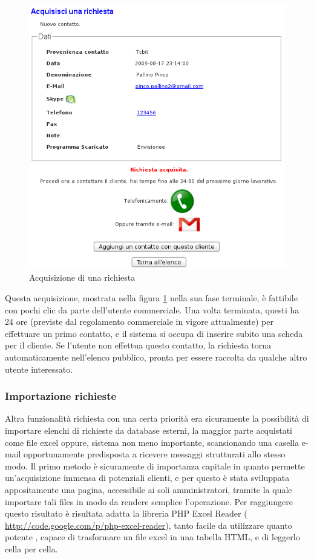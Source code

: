 \begin{figure}[!ht]
\centering
  \includegraphics[scale=0.6]{./images/acquisisciScreen.png}
\caption{Acquisizione di una richiesta}
\label{acq_richieste}
\end{figure}

\noindent
\newpage
Questa acquisizione, mostrata nella figura \ref{acq_richieste} nella sua fase terminale, \`e fattibile con pochi clic da parte dell'utente commerciale. Una volta terminata, questi ha 24 ore (previste dal regolamento commerciale in vigore attualmente) per effettuare un primo contatto, e il sistema si occupa di inserire subito una scheda per il cliente. Se l'utente non effettua questo contatto, la richiesta torna automaticamente nell'elenco pubblico, pronta per essere raccolta da qualche altro utente interessato.


\newpage
\subsubsection{Importazione richieste}
Altra funzionalit\`a richiesta con una certa priorit\`a era sicuramente la possibilit\`a di importare elenchi di richieste da database esterni, la maggior parte acquistati come file excel oppure, sistema non meno importante, scansionando una casella e-mail opportunamente predisposta a ricevere messaggi strutturati allo stesso modo.
Il primo metodo \`e sicuramente di importanza capitale in quanto permette un'acquisizione immensa di potenziali clienti, e per questo \`e stata sviluppata appositamente una pagina, accessibile ai soli amministratori, tramite la quale importare tali files in modo da rendere semplice l'operazione. Per raggiungere questo risultato \`e risultata adatta la libreria PHP Excel Reader ( \url{http://code.google.com/p/php-excel-reader}), tanto facile da utilizzare quanto potente \cite{cinque}, capace di trasformare un file excel in una tabella HTML, e di leggerlo cella per cella.

